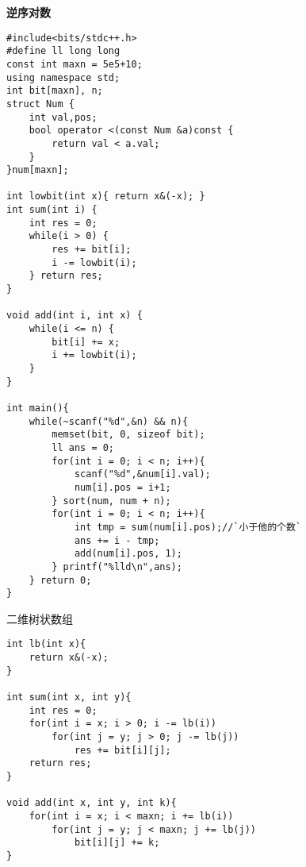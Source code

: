 {\bfseries 逆序对数}

{\begin{lstlisting}
#include<bits/stdc++.h>
#define ll long long
const int maxn = 5e5+10;
using namespace std;
int bit[maxn], n;
struct Num {
    int val,pos;
    bool operator <(const Num &a)const {
        return val < a.val;
    }
}num[maxn];

int lowbit(int x){ return x&(-x); }
int sum(int i) {
    int res = 0;
    while(i > 0) {
        res += bit[i];
        i -= lowbit(i);
    } return res;
}

void add(int i, int x) {
    while(i <= n) {
        bit[i] += x;
        i += lowbit(i);
    }
}

int main(){
    while(~scanf("%d",&n) && n){
        memset(bit, 0, sizeof bit);
        ll ans = 0;
        for(int i = 0; i < n; i++){
            scanf("%d",&num[i].val);
            num[i].pos = i+1;
        } sort(num, num + n);
        for(int i = 0; i < n; i++){
            int tmp = sum(num[i].pos);//`小于他的个数`
            ans += i - tmp;
            add(num[i].pos, 1);
        } printf("%lld\n",ans);
    } return 0;
}
\end{lstlisting}}

二维树状数组

\begin{lstlisting}
int lb(int x){
    return x&(-x);
}

int sum(int x, int y){
    int res = 0;
    for(int i = x; i > 0; i -= lb(i))
        for(int j = y; j > 0; j -= lb(j))
            res += bit[i][j];
    return res;
}

void add(int x, int y, int k){
    for(int i = x; i < maxn; i += lb(i))
        for(int j = y; j < maxn; j += lb(j))
            bit[i][j] += k;
}
\end{lstlisting}




